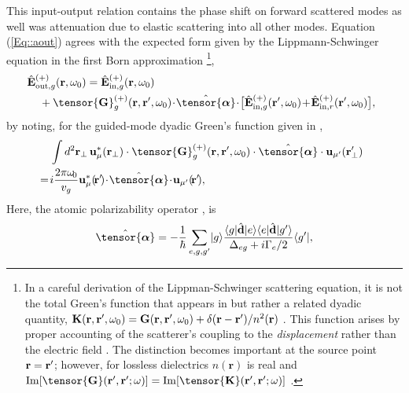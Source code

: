 \documentclass[aps,pra,twocolumn]{revtex4-1} %
\newcommand{\inp}{{\rm in}}
\newcommand{\out}{{\rm out}}
\newcommand{\poltens}{\hat{\tensor{\boldsymbol{\alpha}}}}
\begin{document}
This input-output relation contains the phase shift on forward scattered modes as well was attenuation due to elastic scattering into all other modes. Equation (\ref{Eq::aout}) agrees with the expected form given by the Lippmann-Schwinger equation in the first Born approximation \footnote{In a careful derivation of the Lippman-Schwinger scattering equation, it is not the total Green's function that appears in  but rather a related dyadic quantity, $\mathbf{K}(\mathbf{r},\mathbf{r}', \omega_0) = \mathbf{G}(\mathbf{r},\mathbf{r}', \omega_0) + \delta(\mathbf{r}-\mathbf{r}')/n^2(\mathbf{r})$ \cite{wubs_multiple-scattering_2004}. 
This function arises by proper accounting of the scatterer's coupling to the \emph{displacement} rather than the electric field \cite{yao_ultrahigh_2009}.  The distinction becomes important at the source point $\mathbf{r} = \mathbf{r}'$; however, for lossless dielectrics $n(\mathbf{r})$ is real and ${\rm Im}[\tensor{\mathbf{G}}(\br',\br'; \omega)] = {\rm Im}[\tensor{\mathbf{K}}(\br',\br'; \omega)]$ \cite{yao_-chip_2010}. },
	\begin{align} \label{Eq::IOScatteredField}
		\!\!\!\hat{\mathbf{E}}^{(+)}_{\out,g}&(\br, \omega_0)=\hat{\mathbf{E}}^{(+)}_{ \inp, g}(\br, \omega_0)\nn\\
		&\!\!\!\!\!\!\!\!\!+\tensor{\mathbf{G}}_g^{(+)}(\br,\br',\omega_0)\!\cdot\! \poltens \!\cdot\! \big[\hat{\mathbf{E}}^{(+)}_{\inp, g}(\br', \omega_0)\!+\!\hat{\mathbf{E}}^{(+)}_{\inp,r}(\br', \omega_0) \big],
	\end{align}
by noting, for the guided-mode dyadic Green's function given in ,
	\begin{align}
		\!\!\!\!\!\!\!\!&\quad\int d^2 \mbf{r}_\perp \, \mathbf{u}^*_{\mu} (\br_\perp)\cdot \tensor{\mathbf{G}}_g^{(+)}(\br,\br',\omega_0)\cdot \poltens \cdot \mathbf{u}_{\mu'} (\br'_\perp) \nn\\
		\!\!\!\!&\!=\! i \frac{ 2\pi \omega\!_0}{v_g} \mathbf{u}^*_\mu (\!\br'\!) \!\cdot\! \poltens \!\cdot\! \mathbf{u}_{\mu'} (\!\br'\!) ,
	\end{align}
Here, the atomic polarizability operator \cite{buhmann_casimir-polder_2004, deutsch_quantum_2010,kien_dynamical_2013}, is 
	\begin{equation} \label{Eq::PolarizabilityOperator}
		\poltens = - \frac{1}{\hbar} \sum_{e,g,g'}\ket{g}\frac{\bra{g}\hat{\mathbf{d}}\ket{e}\bra{e} 
\hat{\mathbf{d}}\ket{g'}}{\Delta_{eg} + i \Gamma_{e}/2 }\bra{g'},
	\end{equation}	
\end{document}
